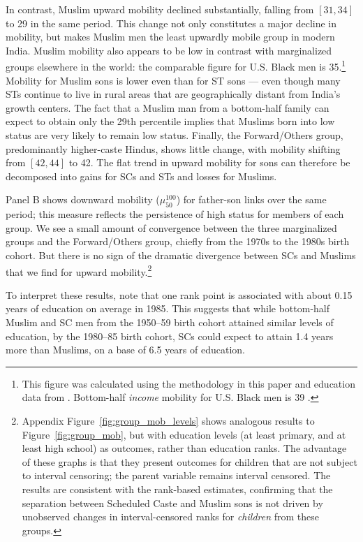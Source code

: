 \documentclass[12pt,letterpaper]{article}
\numberwithin{equation}{section}
\begin{document}
In contrast, Muslim upward mobility declined substantially, falling from $[31, 34]$ to 29 in the same period. This change not only constitutes a major decline in mobility, but makes Muslim men the least upwardly mobile group in modern India. Muslim mobility also appears to be low in contrast with marginalized groups elsewhere in the world: the comparable figure for U.S. Black men is 35.\footnote{This figure was calculated using the methodology in this paper and education data from . Bottom-half \textit{income} mobility for U.S. Black men is 39 \cite{chetty2018}.} Mobility for Muslim sons is lower even than for ST sons --- even though many STs continue to live in rural areas that are geographically distant from India's growth centers. The fact that a Muslim man from a bottom-half family can expect to obtain only the 29th percentile implies that Muslims born into low status are very likely to remain low status. Finally, the Forward/Others group, predominantly higher-caste Hindus, shows little change, with mobility shifting from $[42,44]$ to 42. The flat trend in upward mobility for sons can therefore be decomposed into gains for SCs and STs and losses for Muslims.

Panel B shows downward mobility ($\mu_{50}^{100}$) for father-son links over the same period; this measure reflects the persistence of high status for members of each group. We see a small amount of convergence between the three marginalized groups and the Forward/Others group, chiefly from the 1970s to the 1980s birth cohort. But there is no sign of the dramatic divergence between SCs and Muslims that we find for upward mobility.\footnote{Appendix Figure~\ref{fig:group_mob_levels} shows analogous results to Figure~\ref{fig:group_mob}, but with education levels (at least primary, and at least high school) as outcomes, rather than education ranks. The advantage of these graphs is that they present outcomes for children that are not subject to interval censoring; the parent variable remains interval censored. The results are consistent with the rank-based estimates, confirming that the separation between Scheduled Caste and Muslim sons is not driven by unobserved changes in interval-censored ranks for \textit{children} from these groups.}

To interpret these results, note that one rank point is associated with about 0.15 years of education on average in 1985. This suggests that while bottom-half Muslim and SC men from the 1950--59 birth cohort attained similar levels of education, by the 1980--85 birth cohort, SCs could expect to attain 1.4 years more than Muslims, on a base of 6.5 years of education.
\end{document}
